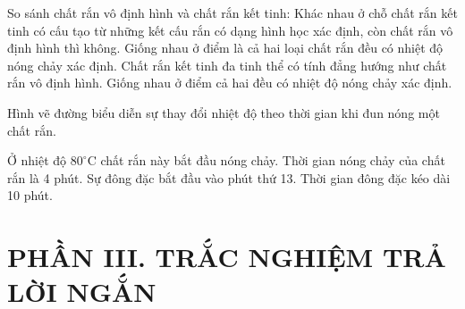 \begin{ex}
So sánh chất rắn vô định hình và chất rắn kết tinh:
\choiceTF
{\True Khác nhau ở chỗ chất rắn kết tinh có cấu tạo từ những kết cấu rắn có dạng hình học xác định, còn chất rắn vô định hình thì không.}
{Giống nhau ở điểm là cả hai loại chất rắn đều có nhiệt độ nóng chảy xác định.}
{\True Chất rắn kết tinh đa tinh thể có tính đẳng hướng như chất rắn vô định hình.}
{Giống nhau ở điểm cả hai đều có nhiệt độ nóng chảy xác định.}
\end{ex}


\begin{ex}
Hình vẽ đường biểu diễn sự thay đổi nhiệt độ theo thời gian khi đun nóng một chất rắn.

\begin{center}
\end{center}

\choiceTF
{\True Ở nhiệt độ $80^\circ$C chất rắn này bắt đầu nóng chảy.}
{Thời gian nóng chảy của chất rắn là 4 phút.}
{\True Sự đông đặc bắt đầu vào phút thứ 13.}
{Thời gian đông đặc kéo dài 10 phút.}
\end{ex}



\section*{PHẦN III. TRẮC NGHIỆM TRẢ LỜI NGẮN}


